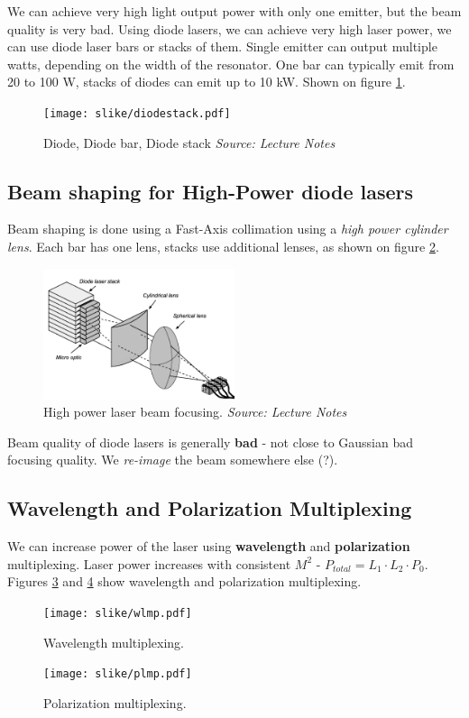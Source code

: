 We can achieve very high light output power 
with only one emitter, but the beam quality is very bad. Using diode lasers, we can achieve very high laser power, we can use diode laser bars or stacks of them.
Single emitter can output multiple watts, depending on the width of the resonator. One bar can typically emit from 20 to 100 W, stacks of diodes can emit up to 10 kW.
Shown on figure \ref{fig:diodestacks}.

\begin{figure}[h!]
    \centering
    \texttt{[image: slike/diodestack.pdf]}
    \caption{Diode, Diode bar, Diode stack \textit{Source: Lecture Notes}}
    \label{fig:diodestacks}
\end{figure}

\subsection{Beam shaping for High-Power diode lasers}
Beam shaping is done using a Fast-Axis collimation using a \textit{high power cylinder lens}.
Each bar has one lens, stacks use additional lenses, as shown on figure \ref{fig:hpc}.
\begin{figure}[h!]
    \centering
    \includegraphics[width=0.5\textwidth]{slike/hpc.png}
    \caption{ High power laser beam focusing. \textit{Source: Lecture Notes}}
    \label{fig:hpc}
\end{figure}

Beam quality of diode lasers is generally \textbf{bad} - not close to Gaussian \pd bad focusing quality.
We \textit{re-image} the beam somewhere else (?).

\subsection{Wavelength and Polarization Multiplexing}

We can increase power of the laser using \textbf{wavelength} and \textbf{polarization} multiplexing.
Laser power increases with consistent $M^2$ - $ P_{total} = L_1 \cdot L_2 \cdot P_0$.
Figures \ref{fig:wm} and \ref{fig:pm} show wavelength and polarization multiplexing.
\begin{figure}[h!]
    \centering
    \texttt{[image: slike/wlmp.pdf]}
    \caption{Wavelength multiplexing.}
    \label{fig:wm}
\end{figure}
\begin{figure}[h!]
    \centering
    \texttt{[image: slike/plmp.pdf]}
    \caption{Polarization multiplexing.}
    \label{fig:pm}
\end{figure}

